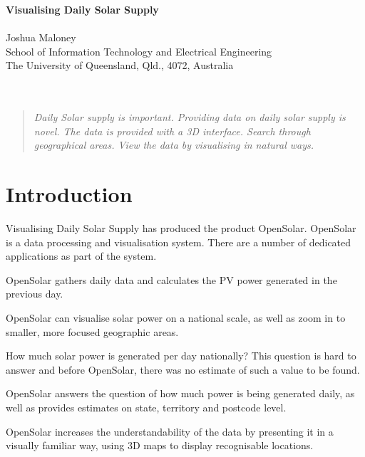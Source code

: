 \documentclass[10pt, a4paper]{article}
\begin{document}
\begin{center}
\Large
\textbf{Visualising Daily Solar Supply } \\ 
\hfill\\
\large
Joshua Maloney \\
School of Information Technology and Electrical Engineering \\
The University of Queensland, Qld., 4072, Australia \\
\hfill\\
\hfill\\
\end{center}


\begin{multicols}{2}

\begin{abstract}
\textit{
   Daily Solar supply is important.
   Providing data on daily solar supply is novel.
   The data is provided with a 3D interface.
   Search through geographical areas.
   View the data by visualising in natural ways.
  }
\end{abstract}

\section{Introduction}


Visualising Daily Solar Supply has produced the product OpenSolar. OpenSolar is a data processing and visualisation system. There are a number of dedicated applications as part of the system.

OpenSolar gathers daily data and calculates the PV power generated in the previous day.

OpenSolar can visualise solar power on a national scale, as well as zoom in to smaller, more focused geographic areas.

How much solar power is generated per day nationally? This question is hard to answer and before OpenSolar, there was no estimate of such a value to be found.

OpenSolar answers the question of how much power is being generated daily, as well as provides estimates on state, territory and postcode level.

OpenSolar increases the understandability of the data by presenting it in a visually familiar way, using 3D maps to display recognisable locations.


\end{multicols}
\end{document}
